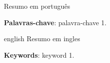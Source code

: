 
\setlength{\absparsep}{18pt} %
\begin{resumo}
	Resumo em português
	
	\vspace{\onelineskip}
	\noindent 
	\textbf{Palavras-chave}: palavra-chave 1.
\end{resumo}

\begin{resumo}[Abstract]
	\begin{otherlanguage*}{english}
		Resumo em ingles
		
		\vspace{\onelineskip}
		\noindent 
		\textbf{Keywords}: keyword 1.
	\end{otherlanguage*}
\end{resumo}